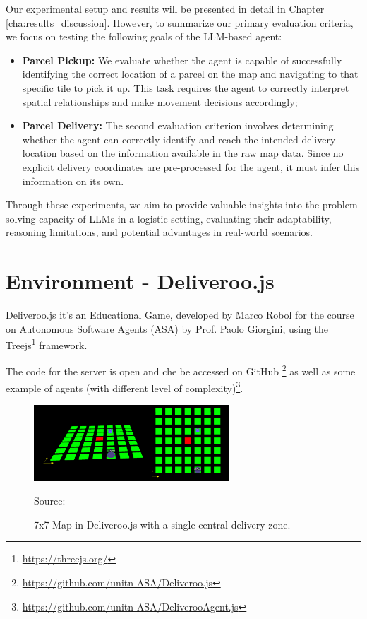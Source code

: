 Our experimental setup and results will be presented in detail in Chapter \ref{cha:results_discussion}.
However, to summarize our primary evaluation criteria, we focus on testing the
following goals of the LLM-based agent:

\begin{itemize}
  \item \textbf{Parcel Pickup:} We evaluate whether the agent is capable of
    successfully identifying the correct location of a parcel on the map and
    navigating to that specific tile to pick it up. This task requires the agent
    to correctly interpret spatial relationships and make movement decisions accordingly;

  \item \textbf{Parcel Delivery:} The second evaluation criterion involves
    determining whether the agent can correctly identify and reach the intended
    delivery location based on the information available in the raw map data. Since
    no explicit delivery coordinates are pre-processed for the agent, it must
    infer this information on its own.
\end{itemize}

Through these experiments, we aim to provide valuable insights into the problem-solving
capacity of LLMs in a logistic setting, evaluating their adaptability, reasoning
limitations, and potential advantages in real-world scenarios.

\section{Environment - Deliveroo.js}
\label{sec:environment_deliveroo_js}

Deliveroo.js it's an Educational Game, developed by Marco Robol for the course on
Autonomous Software Agents (ASA) by Prof. Paolo Giorgini, using the Treejs\footnote{\url{https://threejs.org/}}
framework.

The code for the server is open and che be accessed on GitHub \footnote{\url{https://github.com/unitn-ASA/Deliveroo.js}}
as well as some example of agents (with different level of complexity)\footnote{\url{https://github.com/unitn-ASA/DeliverooAgent.js}}.

\begin{figure}[h!]
  \centering
  \includegraphics[width=0.65\textwidth]{images/deliveroo_js.png}
  \caption{7x7 Map in Deliveroo.js with a single central delivery zone.}
  { Source: } \label{fig:deliveroo_js}
\end{figure}

